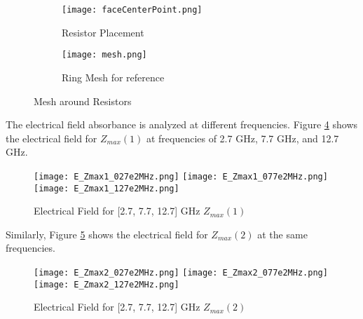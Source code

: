         \begin{figure}
            \centering
            \begin{subfigure}{0.49\textwidth}
                \centering
                \texttt{[image: faceCenterPoint.png]}
                \caption{Resistor Placement}
                \label{img:resistors}
            \end{subfigure}
            \hfill
            \begin{subfigure}{0.49\textwidth}
                \centering
                \texttt{[image: mesh.png]}
                \caption{Ring Mesh for reference}
                \label{img:RingAndArrowMesh}
            \end{subfigure}
            \caption{Mesh around Resistors}
            \label{fig:combined}
        \end{figure}

        The electrical field absorbance is analyzed at different frequencies. 
        Figure \ref{img:E_Zmax1} shows the electrical field for $Z_{max}(1)$
        at frequencies of 2.7 GHz, 7.7 GHz, and 12.7 GHz.
        \begin{figure}[h]
            \centering
            
            \texttt{[image: E\_Zmax1\_027e2MHz.png]}\hfil
            \texttt{[image: E\_Zmax1\_077e2MHz.png]}\hfil
            \texttt{[image: E\_Zmax1\_127e2MHz.png]}
            
            \caption{Electrical Field for [2.7, 7.7, 12.7] GHz $Z_{max}(1)$}
            \label{img:E_Zmax1}
        \end{figure}

        Similarly, Figure \ref{img:E_Zmax2} shows the electrical field for $Z_{max}(2)$
        at the same frequencies.
        \begin{figure}[h]
            \centering
            
            \texttt{[image: E\_Zmax2\_027e2MHz.png]}\hfil
            \texttt{[image: E\_Zmax2\_077e2MHz.png]}\hfil
            \texttt{[image: E\_Zmax2\_127e2MHz.png]}
            
            \caption{Electrical Field for [2.7, 7.7, 12.7] GHz $Z_{max}(2)$}
            \label{img:E_Zmax2}
        \end{figure}

